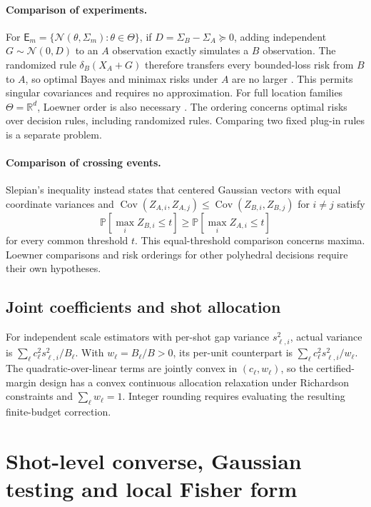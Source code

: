 \documentclass[a4paper,onecolumn,unpublished,nopdfoutputerror]{quantumarticle}
\theoremstyle{plain}
\theoremstyle{definition}
\newcommand{\Prob}{\mathbb{P}}
\newcommand{\Cov}{\operatorname{Cov}}
\newcommand{\calN}{\mathcal{N}}
\newcommand{\R}{\mathbb{R}}
\newcommand{\1}{\mathbf{1}}
\begin{document}
\paragraph{Comparison of experiments.}
For $\mathsf E_m=\{\calN(\theta,\Sigma_m):\theta\in\Theta\}$, if $D=\Sigma_B-\Sigma_A\succeq0$, adding independent $G\sim\calN(0,D)$ to an $A$ observation exactly simulates a $B$ observation. The randomized rule $\delta_B(X_A+G)$ therefore transfers every bounded-loss risk from $B$ to $A$, so optimal Bayes and minimax risks under $A$ are no larger \cite{Blackwell1953}. This permits singular covariances and requires no approximation. For full location families $\Theta=\R^d$, Loewner order is also necessary \cite{Torgersen1991}. The ordering concerns optimal risks over decision rules, including randomized rules. Comparing two fixed plug-in rules is a separate problem.

\paragraph{Comparison of crossing events.}
Slepian's inequality \cite{Slepian1962} instead states that centered Gaussian vectors with equal coordinate variances and $\Cov(Z_{A,i},Z_{A,j})\le\Cov(Z_{B,i},Z_{B,j})$ for $i\ne j$ satisfy
\[
\Prob[\max_iZ_{B,i}\le t]\ge\Prob[\max_iZ_{A,i}\le t]
\]
for every common threshold $t$. This equal-threshold comparison concerns maxima. Loewner comparisons and risk orderings for other polyhedral decisions require their own hypotheses.

\subsection{Joint coefficients and shot allocation}
\label{app:joint_allocation}
For independent scale estimators with per-shot gap variance $s_{\ell,i}^2$, actual variance is $\sum_\ell c_\ell^2s_{\ell,i}^2/B_\ell$. With $w_\ell=B_\ell/B>0$, its per-unit counterpart is $\sum_\ell c_\ell^2s_{\ell,i}^2/w_\ell$. The quadratic-over-linear terms are jointly convex in $(c_\ell,w_\ell)$, so the certified-margin design has a convex continuous allocation relaxation under Richardson constraints and $\sum_\ell w_\ell=1$. Integer rounding requires evaluating the resulting finite-budget correction.

\section{Shot-level converse, Gaussian testing and local Fisher form}
\label{app:converse_proofs}
\end{document}
